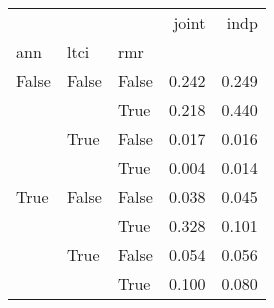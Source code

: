 \begin{tabular}{lllrr}
\toprule
     &      &      &  joint &   indp \\
ann & ltci & rmr &        &        \\
\midrule
False & False & False &  0.242 &  0.249 \\
     &      & True &  0.218 &  0.440 \\
     & True & False &  0.017 &  0.016 \\
     &      & True &  0.004 &  0.014 \\
True & False & False &  0.038 &  0.045 \\
     &      & True &  0.328 &  0.101 \\
     & True & False &  0.054 &  0.056 \\
     &      & True &  0.100 &  0.080 \\
\bottomrule
\end{tabular}
